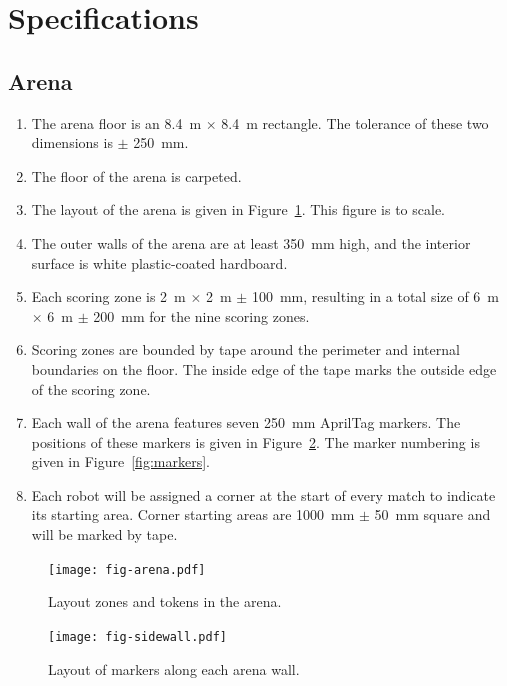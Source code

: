 \section{Specifications}
\label{sec:specs}

\subsection{Arena}
\label{spec:arena}

\begin{enumerate}
  \item The arena floor is an \SI{8.4}{m} $\times$ \SI{8.4}{m} rectangle. The
        tolerance of these two dimensions is $\pm$ \SI{250}{mm}.
  \item The floor of the arena is carpeted.
  \item The layout of the arena is given in Figure~\ref{fig:arena}. This
        figure is to scale.
  \item The outer walls of the arena are at least \SI{350}{mm} high, and the
        interior surface is white plastic-coated hardboard.
  \item Each scoring zone is \SI{2}{m} $\times$ \SI{2}{m} $\pm$ \SI{100}{mm},
        resulting in a total size of \SI{6}{m} $\times$ \SI{6}{m} $\pm$ \SI{200}{mm}
        for the nine scoring zones.
  \item Scoring zones are bounded by tape around the perimeter
        and internal boundaries on the floor. The inside edge of the tape marks the outside
        edge of the scoring zone.
  \item Each wall of the arena features seven \SI{250}{mm} AprilTag markers.
        The positions of these markers is given in Figure~\ref{fig:sidewall}.
        The marker numbering is given in Figure~\ref{fig:markers}.
  \item Each robot will be assigned a corner at the start of every match to indicate its starting area.
        Corner starting areas are \SI{1000}{mm} $\pm$ \SI{50}{mm} square and will be marked by tape.
\end{enumerate}

\begin{figure}
  \centering
  \texttt{[image: fig-arena.pdf]}
  \caption{Layout zones and tokens in the arena.}
  \label{fig:arena}
\end{figure}


\begin{figure}
  \centering
  \texttt{[image: fig-sidewall.pdf]}
  \caption{Layout of markers along each arena wall.}
  \label{fig:sidewall}
\end{figure}


